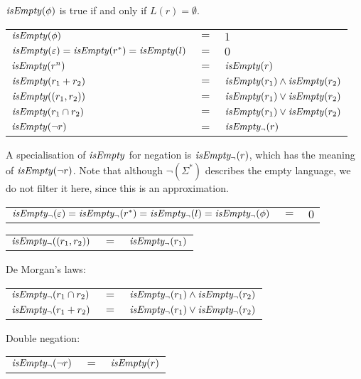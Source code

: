 \needspace{6cm}
\begin{defn}[Approximation for $L(r) = \emptyset$]
   \label{defn-isempty}
   $\mathit{isEmpty}(\phi)$ is true if and only if $L(r) = \emptyset$.

   \begin{tabular}{lll}
      $\mathit{isEmpty}(\phi)$	& 	$=$ & $1$ \\
      $\mathit{isEmpty}(\varepsilon) = \mathit{isEmpty}(r^*) = \mathit{isEmpty}(l)$
         & $=$ & $0$ \\
      $\mathit{isEmpty}(r^n)$		& $=$ & $\mathit{isEmpty}(r)$ \\
      $\mathit{isEmpty}(r_1 + r_2)$	& $=$ & $\mathit{isEmpty}(r_1) \wedge \mathit{isEmpty}(r_2)$ \\
      $\mathit{isEmpty}((r_1, r_2))$	& $=$ & $\mathit{isEmpty}(r_1) \vee \mathit{isEmpty}(r_2)$ \\
      $\mathit{isEmpty}(r_1 \cap r_2)$	& $=$ & $\mathit{isEmpty}(r_1) \vee \mathit{isEmpty}(r_2)$ \\
      $\mathit{isEmpty}(\neg r)$	& $=$ & $\mathit{isEmpty_\neg}(r)$ \\
   \end{tabular}

   A specialisation of $\mathit{isEmpty}$ for negation is $\mathit{isEmpty_\neg}(r)$, which has
   the meaning of $\mathit{isEmpty}(\neg r)$. Note that although $\neg(\Sigma^*)$
   describes the empty language, we do not filter it here, since this is an
   approximation.

   \begin{tabular}{lll}
      $\mathit{isEmpty_\neg}(\varepsilon) = \mathit{isEmpty_\neg}(r^*) = \mathit{isEmpty_\neg}(l) = \mathit{isEmpty_\neg}(\phi)$ & $=$ & $0$ \\
   \end{tabular}

   \begin{tabular}{lll}
      $\mathit{isEmpty_\neg}((r_1, r_2))$		& $=$ & $\mathit{isEmpty_\neg}(r_1)$ \\
   \end{tabular}

   De Morgan's laws:

   \begin{tabular}{lll}
      $\mathit{isEmpty_\neg}(r_1 \cap r_2)$	& $=$ & $\mathit{isEmpty_\neg}(r_1) \wedge \mathit{isEmpty_\neg}(r_2)$ \\
      $\mathit{isEmpty_\neg}(r_1 + r_2)$		& $=$ & $\mathit{isEmpty_\neg}(r_1) \vee \mathit{isEmpty_\neg}(r_2)$ \\
   \end{tabular}

   Double negation:

   \begin{tabular}{lll}
      $\mathit{isEmpty_\neg}(\neg r)$	& $=$ & $\mathit{isEmpty}(r)$ \\
   \end{tabular}
\end{defn}

